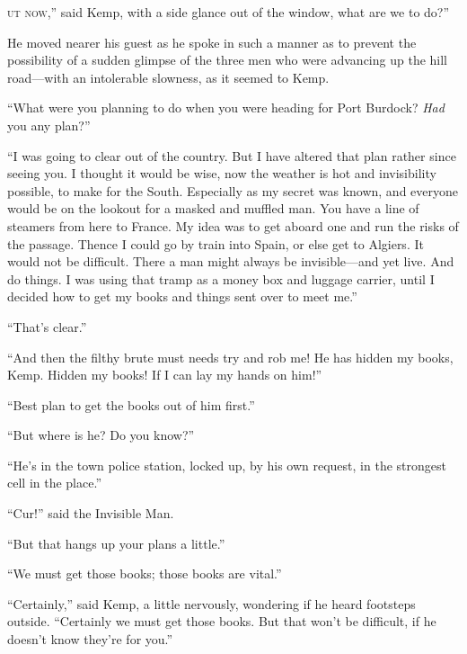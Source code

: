 \label{ch:24}
\begin{ChapterStart}
\vspace*{2\nbs}

\vspace{1.5\nbs}
\end{ChapterStart}

\kern-5pt\textsc{ut now},” said Kemp, with a side glance out of the window, what are we to do?”

He moved nearer his guest as he spoke in such a manner as to prevent the possibility of a sudden glimpse of the three men who were advancing up the hill road—with an intolerable slowness, as it seemed to Kemp.

“What were you planning to do when you were heading for Port Burdock? \emph{Had} you any plan?”

“I was going to clear out of the country. But I have altered that plan rather since seeing you. I thought it would be wise, now the weather is hot and invisibility possible, to make for the South. Especially as my secret was known, and everyone would be on the lookout for a masked and muffled man. You have a line of steamers from here to France. My idea was to get aboard one and run the risks of the passage. Thence I could go by train into Spain, or else get to Algiers. It would not be difficult. There a man might always be invisible—and yet live. And do things. I was using that tramp as a money box and luggage carrier, until I decided how to get my books and things sent over to meet me.”

“That’s clear.”

“And then the filthy brute must needs try and rob me! He has hidden my books, Kemp. Hidden my books! If I can lay my hands on him!”

“Best plan to get the books out of him first.”

“But where is he? Do you know?”

“He’s in the town police station, locked up, by his own request, in the strongest cell in the place.”

“Cur!” said the Invisible Man.

“But that hangs up your plans a little.”

“We must get those books; those books are vital.”

“Certainly,” said Kemp, a little nervously, wondering if he heard footsteps outside. “Certainly we must get those books. But that won’t be difficult, if he doesn’t know they’re for you.”

